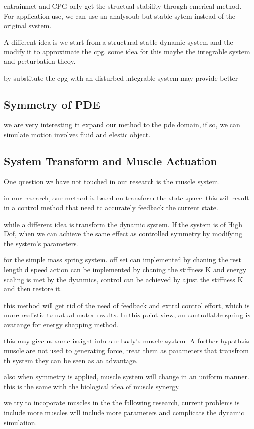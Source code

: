 entrainmet and CPG only get the structual stability through emerical method.
For application use, we can use an analysoub but stable sytem instead of the original system.


A different idea is we start from a structural stable dynamic system and the modify it to approximate the cpg.
some idea for this maybe the integrable system and perturbation theoy.

by substitute the cpg with an disturbed integrable system may provide better 
\subsection{Symmetry of PDE}
we are very interesting in expand our method to the pde domain, if so, we can simulate motion involves fluid and elestic object.

\subsection{System Transform and Muscle Actuation}
One question we have not touched in our research is the muscle system.

in our research, our method is based on transform the state space.
this will result in a control method that need to accurately feedback the current state.

while a different idea is transform the dynamic system.
If the system is of High Dof, when we can achieve the same effect as controlled symmetry by modifying the system's parameters.

for the simple  mass spring system.
off set can implemented by chaning the rest length d
speed action can be implemented by chaning the stiffness K
 and energy scaling is met by the dyanmics, control can be achieved by ajust the stiffness K and then restore it.


this method will get rid of the need of feedback and extral control effort, which is more realistic to natual motor results.
In this point view, an controllable spring is avatange for energy shapping method.

this may give us some insight into our body's muscle system.
A further hypothsis muscle are not used to generating force, treat them as parameters that transfrom th system they can be seen as an advantage.

also when symmetry is applied, muscle system will change in an uniform manner.
this is the same with the biological idea of muscle synergy.

we try to incoporate muscles in the the following research, current problems is include more muscles will include more parameters and complicate the dynamic simulation.



